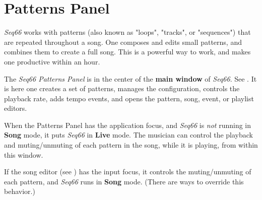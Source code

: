 %
%
%

\section{Patterns Panel}
\label{sec:patterns_panel}

   \textsl{Seq66} works with patterns (also known as "loops", "tracks", or
   "sequences") that are repeated throughout a song.
   One composes and edits small patterns,
   and combines them to create a full song.  This is a powerful way
   to work, and makes one productive within an hour.

   The \textsl{Seq66 Patterns Panel} is in the center of the
   \textbf{main window} of \textsl{Seq66}.
   See .
   It is here one creates a set of patterns,
   manages the configuration, controls the playback rate, adds tempo events,
   and opens the pattern, song, event, or playlist editors.

   When the Patterns Panel has the application focus,
   and \textsl{Seq66} is \textsl{not} running in \textbf{Song} mode,
   it puts \textsl{Seq66} in \textbf{Live} mode.
   The musician can
   control the playback and muting/unmuting of each pattern in
   the song, while it is playing, from within this window.

   If the song editor (see )
   has the input focus, it controls the muting/unmuting of
   each pattern, and \textsl{Seq66} runs in \textbf{Song} mode.
   (There are ways to override this behavior.)


